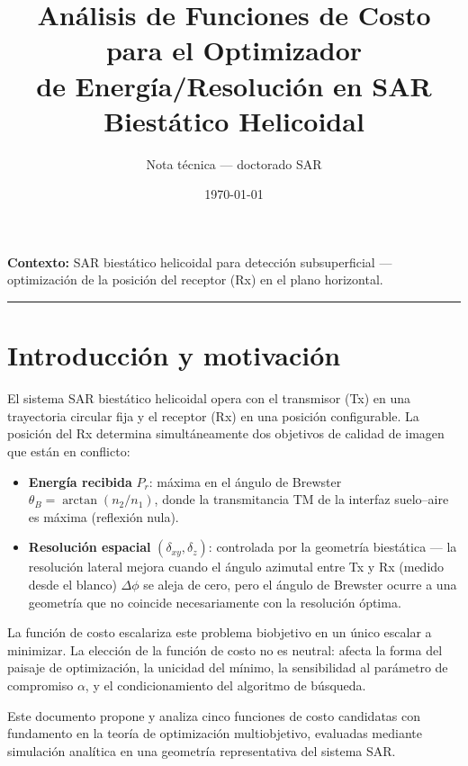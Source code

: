\documentclass[11pt, a4paper]{article}
\title{\textbf{Análisis de Funciones de Costo para el Optimizador\\
       de Energía/Resolución en SAR Biestático Helicoidal}}
\author{Nota técnica — doctorado SAR}
\date{\today}
\newcommand{\dxy}{\delta_{xy}}
\newcommand{\dz}{\delta_z}
\begin{document}

\maketitle
\thispagestyle{empty}

\noindent\textbf{Contexto:} SAR biestático helicoidal para detección subsuperficial
— optimización de la posición del receptor (Rx) en el plano horizontal.
\vspace{6pt}

\noindent\rule{\linewidth}{0.4pt}

\section{Introducción y motivación}

El sistema SAR biestático helicoidal opera con el transmisor (Tx) en una trayectoria
circular fija y el receptor (Rx) en una posición configurable. La posición del Rx
determina simultáneamente dos objetivos de calidad de imagen que están en conflicto:

\begin{itemize}
  \item \textbf{Energía recibida} $P_r$: máxima en el ángulo de Brewster
    $\theta_B = \arctan(n_2/n_1)$, donde la transmitancia TM de la interfaz
    suelo–aire es máxima (reflexión nula).

  \item \textbf{Resolución espacial} $(\dxy, \dz)$: controlada por la geometría
    biestática — la resolución lateral mejora cuando el ángulo azimutal entre Tx y Rx
    (medido desde el blanco) $\Delta\phi$ se aleja de cero, pero el ángulo de Brewster
    ocurre a una geometría que no coincide necesariamente con la resolución óptima.
\end{itemize}

La función de costo escalariza este problema biobjetivo en un único escalar a minimizar.
La elección de la función de costo no es neutral: afecta la forma del paisaje de
optimización, la unicidad del mínimo, la sensibilidad al parámetro de compromiso
$\alpha$, y el condicionamiento del algoritmo de búsqueda.

Este documento propone y analiza cinco funciones de costo candidatas con fundamento
en la teoría de optimización multiobjetivo, evaluadas mediante simulación analítica
en una geometría representativa del sistema SAR.
\end{document}
